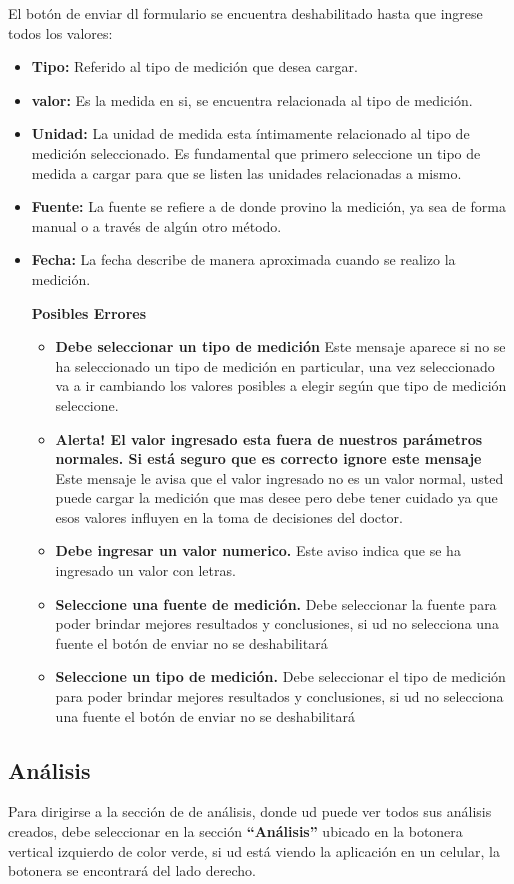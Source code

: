 El botón de enviar dl formulario se encuentra deshabilitado hasta que ingrese todos los valores:

\begin{itemize}
		\item \textbf{Tipo: } Referido al tipo de medición que desea cargar.
	\item \textbf{valor:} Es la medida en si, se encuentra relacionada al tipo de medición.
	\item \textbf{Unidad: } La unidad de medida esta íntimamente relacionado al tipo de medición seleccionado. Es fundamental que primero seleccione un tipo de medida a cargar para que se listen las unidades relacionadas a mismo.
	\item \textbf{Fuente:} La fuente se refiere a de donde provino la medición, ya sea de forma manual o a través de algún otro método.
	\item \textbf{Fecha:} La fecha describe de manera aproximada cuando se realizo la medición.

\textbf{Posibles Errores}
\begin{itemize}
	\item \textbf{Debe seleccionar un tipo de medición} Este mensaje aparece si no se ha seleccionado un tipo de medición en particular, una vez seleccionado va a ir cambiando los valores posibles a elegir según que tipo de medición seleccione.
	\item \textbf{Alerta! El valor ingresado esta fuera de nuestros parámetros normales. Si está seguro que es correcto ignore este mensaje} Este mensaje le avisa que el valor ingresado no es un valor normal, usted puede cargar la medición que mas desee pero debe tener cuidado ya que esos valores influyen en la toma de decisiones del doctor.
	\item \textbf{Debe ingresar un valor numerico.} Este aviso indica que se ha ingresado un valor con letras.
	\item \textbf{Seleccione una fuente de medición.} Debe seleccionar la fuente para poder brindar mejores resultados y conclusiones, si ud no selecciona una fuente el botón de enviar no se deshabilitará
	\item \textbf{Seleccione un tipo de medición.} Debe seleccionar el tipo de medición para poder brindar mejores resultados y conclusiones, si ud no selecciona una fuente el botón de enviar no se deshabilitará
\end{itemize}
\end{itemize}


\subsection{Análisis}
Para dirigirse a la sección de  de análisis, donde ud puede ver todos sus análisis creados, debe seleccionar en la sección \textbf{``Análisis''} ubicado en la botonera vertical izquierdo de color verde, si ud está viendo la aplicación en un celular, la botonera se encontrará del lado derecho.

